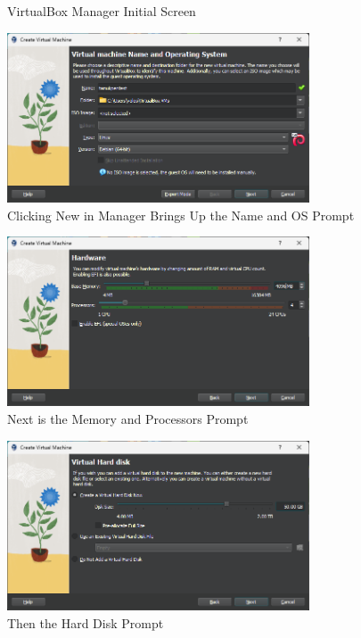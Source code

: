 \documentclass[12pt]{article}
\newenvironment{problem}[2][Problem]{\begin{trivlist}
\item[\hskip \labelsep {\bfseries #1}\hskip \labelsep {\bfseries #2.}]}{\end{trivlist}}
\begin{document}
\begin{problem}{1}
\begin{figure}[H]
        \caption{VirtualBox Manager Initial Screen}
    \end{figure}
    \begin{figure}[H]
        \centering
        \includegraphics[width=0.8\textwidth]{name_and_os}
        \caption{Clicking New in Manager Brings Up the Name and OS Prompt}
    \end{figure}
    \begin{figure}[H]
        \centering
        \includegraphics[width=0.8\textwidth]{memory_and_cpus}
        \caption{Next is the Memory and Processors Prompt}
    \end{figure}
    \begin{figure}[H]
        \centering
        \includegraphics[width=0.8\textwidth]{hard_disk}
        \caption{Then the Hard Disk Prompt}
    \end{figure}

\end{problem}
\end{document}
